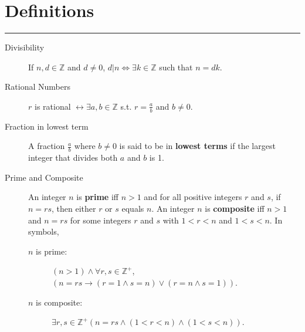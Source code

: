 \documentclass{article}
\begin{document}
\section*{Definitions}
\hrule
\vspace{0.3cm}
\begin{description}
    \item[Divisibility] If $n,d\in\mathbb{Z}$ and $d\neq0$, $d\vert{n}\Leftrightarrow \exists{k} \in \mathbb{Z}$ such that $n=dk$.
    \item[Rational Numbers]$r$ is rational $\leftrightarrow \exists a,b\in\mathbb{Z}$ s.t. $r=\frac{a}{b}$ and $b\neq0$.
    \item[Fraction in lowest term]A fraction $\frac{a}{b}$ where $b\neq0$ is said to be in \textbf{lowest terms} if the largest integer that divides both $a$ and $b$ is 1. 
    \item[Prime and Composite] An integer $n$ is \textbf{prime} iff $n > 1$ and for all positive integers $r$ and $s$, if $n=rs$, then either $r$ or $s$ equals $n$. An integer $n$ is \textbf{composite} iff $n >  1$ and $n=rs$ for some integers $r$ and $s$ with $1 < r < n$ and $1 < s < n$. In symbols, 
    \begin{description}
		\item[$n$ is prime:] $(n > 1) \land \forall r, s\in \mathbb{Z}^{+}$, $(n=rs\to (r=1\land s=n) \lor (r=n\land s=1))$. 
		\item[$n$ is composite:] $\exists r, s\in \mathbb{Z}^{+} (n=rs\land (1 < r < n) \land (1 < s < n))$.
    \end{description}
        

\end{description}
\end{document}
